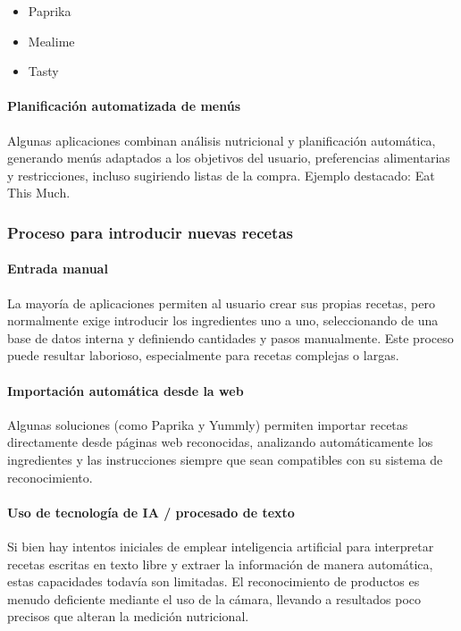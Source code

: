 \begin{itemize}
	\item Paprika
	\item Mealime
	\item Tasty
\end{itemize}

\paragraph*{Planificación automatizada de menús}
Algunas aplicaciones combinan análisis nutricional y planificación automática, generando menús adaptados a los objetivos del usuario, preferencias alimentarias y restricciones, incluso sugiriendo listas de la compra. Ejemplo destacado: Eat This Much.

\subsubsection*{Proceso para introducir nuevas recetas}

\paragraph*{Entrada manual}
La mayoría de aplicaciones permiten al usuario crear sus propias recetas, pero normalmente exige introducir los ingredientes uno a uno, seleccionando de una base de datos interna y definiendo cantidades y pasos manualmente. Este proceso puede resultar laborioso, especialmente para recetas complejas o largas.

\paragraph*{Importación automática desde la web}
Algunas soluciones (como Paprika y Yummly) permiten importar recetas directamente desde páginas web reconocidas, analizando automáticamente los ingredientes y las instrucciones siempre que sean compatibles con su sistema de reconocimiento.

\paragraph*{Uso de tecnología de IA / procesado de texto}
Si bien hay intentos iniciales de emplear inteligencia artificial para interpretar recetas escritas en texto libre y extraer la información de manera automática, estas capacidades todavía son limitadas. El reconocimiento de productos es menudo deficiente mediante el uso de la cámara, llevando a resultados poco precisos que alteran la medición nutricional.

